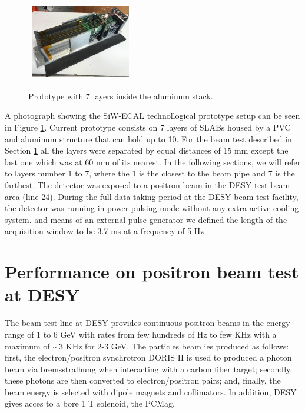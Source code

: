 \documentclass[final,3p,times,twocolumn]{elsarticle}
\begin{document}
\begin{figure}[!t]
\centering
\begin{tabular}{l}
\includegraphics[width=0.4\textwidth]{../figs/proto.png} 
\end{tabular}
\caption{Prototype with 7 layers inside the aluminum stack.}
\label{proto}
\end{figure}

A photograph showing the SiW-ECAL technollogical prototype setup can be seen in Figure \ref{proto}.
Current prototype consists on 7 layers of SLABs housed by a PVC and aluminum structure that can hold up to 10.
For the beam test described in Section \ref{sec:beamtest} all the layers were separated by equal distances of 15 mm
except the last one which was at 60 mm of its nearest. In the following sections, we will refer to layers number 1 to 7, where
the 1 is the closest to the beam pipe and 7 is the farthest.
The detector was exposed to a positron beam in the DESY test beam area (line 24).
During the full data taking period at the DESY beam test facility,
the detector was running in power pulsing mode without any extra active cooling system.
and means of an external pulse generator we defined the length of the acquisition window to be
3.7 ms at a frequency of 5 Hz.

\section{Performance on positron beam test at DESY}
\label{sec:beamtest}


The beam test line at DESY provides continuous positron beams in the energy range of 1 to 6 GeV with
rates from few hundreds of Hz to few KHz with a maximum of $\sim 3$ KHz for 2-3 GeV. 
The particles beam ies produced as follows: first, the electron/positron synchrotron DORIS II 
is used to produced a photon beam via bremsstralhung when interacting with a carbon fiber target;
secondly, these photons are then converted to electron/positron pairs; 
and, finally, the beam energy is selected with dipole magnets and collimators. 
In addition, DESY gives acces to a bore 1 T solenoid, the PCMag.
\end{document}
